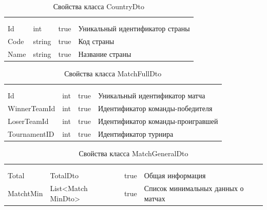 \begin{xltabular}{\textwidth}{|X|X|X|X|}
	\caption{Свойства класса CountryDto}\label{table:CountryDto}\\ \hline
	 &  &  &  \\ \hline
	 &  &  &  \\ \hline
	\endfirsthead
	 \hline
	 &  &  &  \\ \hline
	\endhead
	Id & int & true & Уникальный идентификатор страны \\ \hline
	Code & string & true & Код страны \\ \hline
	Name & string & true & Название страны \\ \hline
\end{xltabular}

\begin{xltabular}{\textwidth}{|X|X|X|X|}
	\caption{Свойства класса MatchFullDto}\label{table:MatchFullDto}\\ \hline
	 &  &  &  \\ \hline
	 &  &  &  \\ \hline
	\endfirsthead
	 \hline
	 &  &  &  \\ \hline
	\endhead
	Id & int & true & Уникальный идентификатор матча \\ \hline
	WinnerTeamId & int & true & Идентификатор команды-победителя \\ \hline
	LoserTeamId & int & true & Идентификатор команды-проигравшей \\ \hline
	TournamentID & int & true & Идентификатор турнира \\ \hline
\end{xltabular}

\begin{xltabular}{\textwidth}{|X|X|c|X|}
	\caption{Свойства класса MatchGeneralDto}\label{table:MatchGeneralDto}\\ \hline
	 &  &  &  \\ \hline
	 &  &  &  \\ \hline
	\endfirsthead
	 \hline
	 &  &  &  \\ \hline
	\endhead
	Total & TotalDto & true & Общая информация \\ \hline
	MatchtMin & List<Match
	MinDto> & true & Список минимальных данных о матчах \\ \hline
\end{xltabular}

